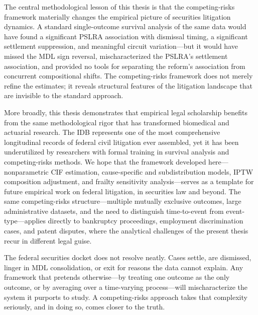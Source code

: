 The central methodological lesson of this thesis is that the
competing-risks framework materially changes the empirical
picture of securities litigation dynamics. A standard
single-outcome survival analysis
of the same data would have found a significant PSLRA
association with dismissal timing, a significant settlement
suppression, and meaningful circuit variation---but it would
have missed the MDL sign reversal, mischaracterized the
PSLRA's settlement association, and provided no tools for
separating the reform's association from concurrent
compositional shifts.
The competing-risks framework does not merely refine the
estimates; it reveals structural features of the litigation
landscape that are invisible to the standard approach.

More broadly, this thesis demonstrates that empirical legal
scholarship benefits from the same methodological rigor that
has transformed biomedical and actuarial research. The
IDB represents one
of the most comprehensive longitudinal records of federal
civil litigation ever assembled, yet it has been
underutilized by researchers with formal training in survival
analysis and competing-risks methods. We hope that the
framework developed here---nonparametric CIF estimation,
cause-specific and subdistribution models, IPTW composition
adjustment, and frailty sensitivity analysis---serves as a
template for future empirical work on federal litigation, in
securities law and beyond. The same competing-risks
structure---multiple mutually exclusive outcomes, large
administrative datasets, and the need to distinguish
time-to-event from event-type---applies directly to
bankruptcy proceedings, employment discrimination cases, and
patent disputes, where the analytical challenges of the
present thesis recur in different legal guise.

The federal securities docket does not resolve neatly. Cases
settle, are dismissed, linger in MDL consolidation, or exit
for reasons the data cannot explain. Any framework that
pretends otherwise---by treating one outcome as the only
outcome, or by averaging over a time-varying process---will
mischaracterize the system it purports to study. A
competing-risks approach takes that complexity seriously, and
in doing so, comes closer to the truth.

